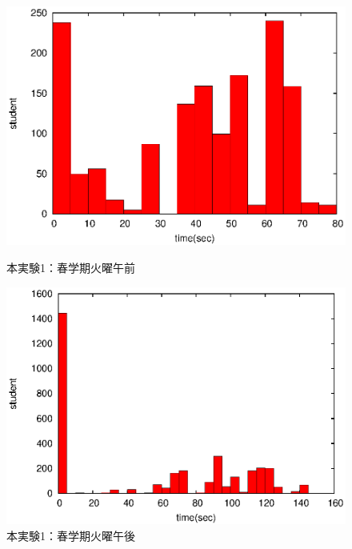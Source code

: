 \documentclass[a4paper,10pt]{jarticle}
\begin{document}
\begin{figure}[htpb]                        
\begin{minipage} {0.5\hsize}                             
\begin{center}                              
\includegraphics[bb=0 0 390 248,clip,width=\hsize]{oTu12_hist.eps}   
\caption{本実験1：春学期火曜午前}                              
\label{oTu12}                                
\end{center}                                    
\end{minipage}                                 
\begin{minipage}{0.5\hsize}                                            
\begin{center}                              
\includegraphics[bb=0 0 390 248,clip,width=\hsize]{oTu345_hist.eps}   
\caption{本実験1：春学期火曜午後}                              
\label{oTu345}                                
\end{center}                                    
\end{minipage}                                 
\end{figure}                                 
\end{document}
